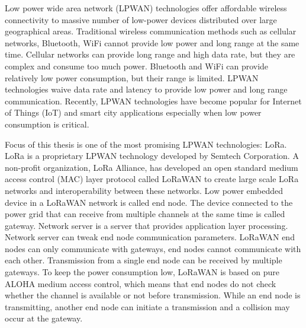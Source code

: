 Low power wide area network (LPWAN) technologies offer affordable wireless connectivity to massive number of low-power devices distributed over large geographical areas. Traditional wireless communication methods such as cellular networks, Bluetooth, WiFi cannot provide low power and long range at the same time. Cellular networks can provide long range and high data rate, but they are complex and consume too much power. Bluetooth and WiFi can provide relatively low power consumption, but their range is limited. LPWAN technologies waive data rate and latency to provide low power and long range communication. Recently, LPWAN technologies have become popular for Internet of Things (IoT) and smart city applications especially when low power consumption is critical.

Focus of this thesis is one of the most promising LPWAN technologies: LoRa. LoRa is a proprietary LPWAN technology developed by Semtech Corporation. A non-profit organization, LoRa Alliance, has developed an open standard medium access control (MAC) layer protocol called LoRaWAN to create large scale LoRa networks and interoperability between these networks. Low power embedded device in a LoRaWAN network is called end node. The device connected to the power grid that can receive from multiple channels at the same time is called gateway. Network server is a server that provides application layer processing. Network server can tweak end node communication parameters. LoRaWAN end nodes can only communicate with gateways, end nodes cannot communicate with each other. Transmission from a single end node can be received by multiple gateways. To keep the power consumption low, LoRaWAN is based on pure ALOHA medium access control, which means that end nodes do not check whether the channel is available or not before transmission. While an end node is transmitting, another end node can initiate a transmission and a collision may occur at the gateway.

